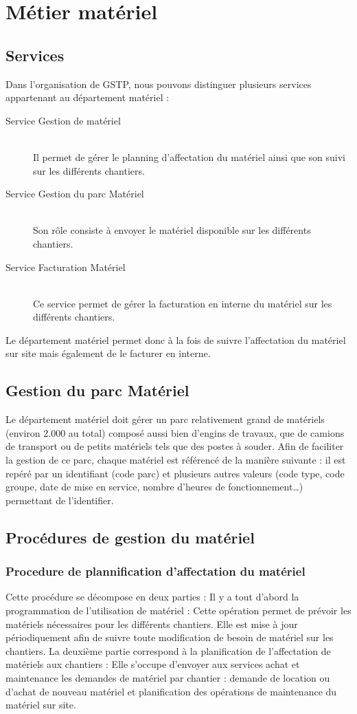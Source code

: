 \section{Métier matériel}
\subsection{Services}
	Dans l’organisation de GSTP, nous pouvons distinguer plusieurs services appartenant au département matériel :
	\begin{description}
		\item[Service Gestion de matériel]~\\
			Il permet de gérer le planning d’affectation du matériel ainsi que son suivi sur les différents chantiers.
		\item[Service Gestion du parc Matériel]~\\ 
			Son rôle consiste à envoyer le matériel disponible sur les différents chantiers.
		\item[Service Facturation Matériel]~\\
			Ce service permet de gérer la facturation en interne du matériel sur les différents chantiers.
	\end{description}	
	Le département matériel permet donc à la fois de suivre l’affectation du matériel sur site mais également de le facturer en interne.

\subsection{Gestion du parc Matériel}
	Le département matériel doit gérer un parc relativement grand de matériels (environ 2.000 au total) composé aussi bien d’engins de travaux, que de camions de transport ou de petits matériels tels que des postes à souder.
Afin de faciliter la gestion de ce parc, chaque matériel est référencé de la manière suivante : il est repéré par un identifiant (code parc) et plusieurs autres valeurs (code type, code groupe, date de mise en service, nombre d’heures de fonctionnement…) permettant de l’identifier.

\subsection{Procédures de gestion du matériel}
	\subsubsection{Procedure de plannification d’affectation du matériel}
	Cette procédure se décompose en deux parties : Il y a tout d’abord la programmation de l’utilisation de matériel : Cette opération permet de prévoir les matériels nécessaires pour les différents chantiers. Elle est mise à jour périodiquement afin de suivre toute modification de besoin de matériel sur les chantiers.
La deuxième partie correspond à la planification de l’affectation de matériels aux chantiers : Elle s’occupe d’envoyer aux services achat et maintenance les demandes de matériel par chantier : demande de location ou d’achat de nouveau matériel et planification des opérations de maintenance du matériel sur site.

